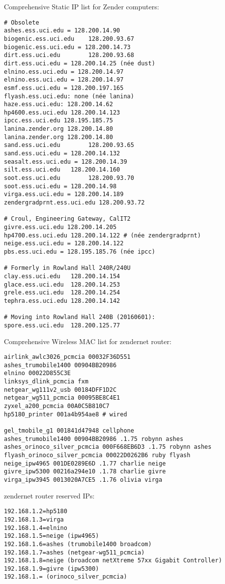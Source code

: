 \documentclass[12pt,twoside]{article}
\begin{document}
Comprehensive Static IP list for Zender computers:
\begin{verbatim}
# Obsolete
ashes.ess.uci.edu = 128.200.14.90
biogenic.ess.uci.edu    128.200.93.67
biogenic.ess.uci.edu = 128.200.14.73
dirt.ess.uci.edu        128.200.93.68
dirt.ess.uci.edu = 128.200.14.25 (née dust)
elnino.ess.uci.edu = 128.200.14.97
elnino.ess.uci.edu = 128.200.14.97
esmf.ess.uci.edu = 128.200.197.165
flyash.ess.uci.edu: none (née lanina)
haze.ess.uci.edu: 128.200.14.62
hp4600.ess.uci.edu 128.200.14.123
ipcc.ess.uci.edu 128.195.185.75
lanina.zender.org 128.200.14.80
lanina.zender.org 128.200.14.80
sand.ess.uci.edu        128.200.93.65
sand.ess.uci.edu = 128.200.14.132
seasalt.ess.uci.edu = 128.200.14.39
silt.ess.uci.edu   128.200.14.160
soot.ess.uci.edu        128.200.93.70
soot.ess.uci.edu = 128.200.14.98
virga.ess.uci.edu = 128.200.14.189
zendergradprnt.ess.uci.edu 128.200.93.72

# Croul, Engineering Gateway, CalIT2
givre.ess.uci.edu 128.200.14.205
hp4700.ess.uci.edu 128.200.14.122 # (née zendergradprnt)
neige.ess.uci.edu = 128.200.14.122
pbs.ess.uci.edu = 128.195.185.76 (née ipcc)

# Formerly in Rowland Hall 240R/240U
clay.ess.uci.edu   128.200.14.154
glace.ess.uci.edu  128.200.14.253
grele.ess.uci.edu  128.200.14.254
tephra.ess.uci.edu 128.200.14.142

# Moving into Rowland Hall 240B (20160601):
spore.ess.uci.edu  128.200.125.77
\end{verbatim}

Comprehensive Wireless MAC list for zendernet router:
\begin{verbatim}
airlink_awlc3026_pcmcia 00032F36D551
ashes_trumobile1400 00904BB20986
elnino 00022D855C3E
linksys_dlink_pcmcia fxm
netgear_wg111v2_usb 00184DFF1D2C
netgear_wg511_pcmcia 00095BE8C4E1
zyxel_a200_pcmcia 00A0C5B810C7
hp5180_printer 001a4b954ae8 # wired

gel_tmobile_g1 001841d47948 cellphone
ashes_trumobile1400 00904BB20986 .1.75 robynn ashes
ashes_orinoco_silver_pcmcia 000F668EB6D3 .1.75 robynn ashes
flyash_orinoco_silver_pcmcia 00022D0262B6 ruby flyash
neige_ipw4965 001DE0289E6D .1.77 charlie neige
givre_ipw5300 00216a294e10 .1.78 charlie givre
virga_ipw3945 0013020A7CE5 .1.76 olivia virga
\end{verbatim}

zendernet router reserved IPs:
\begin{verbatim}
192.168.1.2=hp5180
192.168.1.3=virga
192.168.1.4=elnino
192.168.1.5=neige (ipw4965)
192.168.1.6=ashes (trumobile1400 broadcom)
192.168.1.7=ashes (netgear-wg511_pcmcia)
192.168.1.8=neige (broadcom netXtreme 57xx Gigabit Controller)
192.168.1.9=givre (ipw5300)
192.168.1.= (orinoco_silver_pcmcia)
\end{verbatim}
\end{document}
